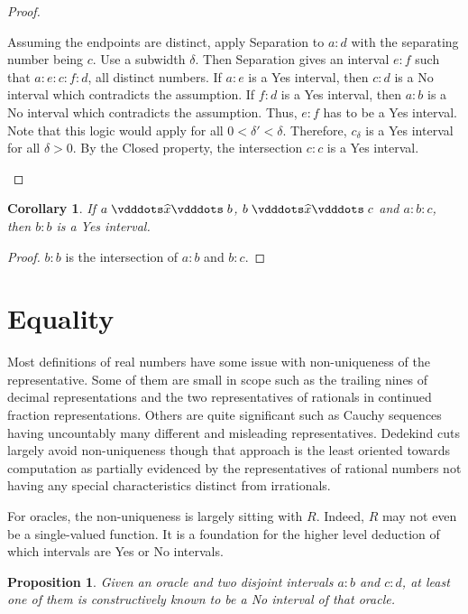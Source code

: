 \documentclass[12pt]{article}
\newtheorem{corollary}{Corollary}[section]
\newtheorem{proposition}{Proposition}[section]
\begin{document}
\begin{proof}
\begin{enumerate}
        Assuming the endpoints are distinct, apply Separation to $a:d$ with the separating number being $c$. Use a subwidth $\delta$. Then Separation gives an interval $e:f$ such that $a:e:c:f:d$, all distinct numbers. If $a:e$ is a Yes interval, then $c:d$ is a No interval which contradicts the assumption. If $f:d$ is a Yes interval, then $a:b$ is a No interval which contradicts the assumption. Thus, $e:f$ has to be a Yes interval. Note that this logic would apply for all $0 < \delta' < \delta$. Therefore, $c_\delta$ is a Yes interval for all $\delta > 0$. By the Closed property, the intersection $c:c$ is a Yes interval. 
     \end{enumerate}
\end{proof}

\begin{corollary}
    If $a \xora b$, $b \xora c$ and $a:b:c$, then $b:b$ is a Yes interval.
\end{corollary}

\begin{proof}
    $b:b$ is the intersection of $a:b$ and $b:c$.
\end{proof}


\section{Equality}

Most definitions of real numbers have some issue with non-uniqueness of the representative. Some of them are small in scope such as the trailing nines of decimal representations and the two representatives of rationals in continued fraction representations. Others are quite significant such as Cauchy sequences having uncountably many different and misleading representatives. Dedekind cuts largely avoid non-uniqueness though that approach is the least oriented towards computation as partially evidenced by the representatives of rational numbers not having any special characteristics distinct from irrationals. 

For oracles, the non-uniqueness is largely sitting with $R$. Indeed, $R$ may not even be a single-valued function. It is a foundation for the higher level deduction of which intervals are Yes or No intervals. 

\begin{proposition}
    Given an oracle and two disjoint intervals $a:b$ and $c:d$, at least one of them is constructively known to be a No interval of that oracle. 
\end{proposition}
\end{document}
